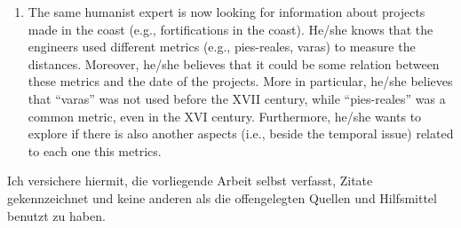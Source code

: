 \documentclass[11pt]{report}
\begin{document}
\begin{enumerate}
	\item The same humanist expert is now looking for information about projects made in the coast (e.g., fortifications in the coast). He/she knows that the engineers used different metrics (e.g., pies-reales, varas) to measure the distances. Moreover, he/she believes that it could be some relation between these metrics and the date of the projects. More in particular, he/she believes that ``varas'' was not used before the XVII century, while ``pies-reales'' was a common metric, even in the XVI century.
Furthermore, he/she wants to explore if there is also another aspects (i.e., beside the temporal issue) related to each one this metrics.
\end{enumerate}

\newpage

Ich versichere hiermit, die vorliegende Arbeit selbst verfasst, Zitate gekennzeichnet und keine anderen als die offengelegten Quellen und Hilfsmittel benutzt zu haben.\\
\end{document}
